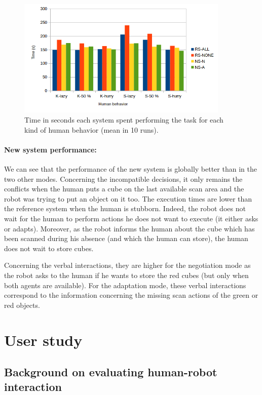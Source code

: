 \documentclass[english,a4paper,11pt,twoside]{StyleThese}
\begin{document}
\begin{figure}[!h]
	\centering
    \includegraphics[width=0.9\textwidth]{figs/Chapter5/Time.png}
    \caption{Time in seconds each system spent performing the task for each kind of human behavior (mean in 10 runs).}
    \label{fig:resTime}
\end{figure}


\paragraph{New system performance:}
We can see that the performance of the new system is globally better than in the two other modes. Concerning the incompatible decisions, it only remains the conflicts when the human puts a cube on the last available scan area and the robot was trying to put an object on it too. The execution times are lower than the reference system when the human is stubborn. Indeed, the robot does not wait for the human to perform actions he does not want to execute (it either asks or adapts). Moreover, as the robot informs the human about the cube which has been scanned during his absence (and which the human can store), the human does not wait to store cubes.

Concerning the verbal interactions, they are higher for the negotiation mode as the robot asks to the human if he wants to store the red cubes (but only when both agents are available). For the adaptation mode, these verbal interactions correspond to the information concerning the missing scan actions of the green or red objects.

\section{User study}

\subsection{Background on evaluating human-robot interaction}
\end{document}
